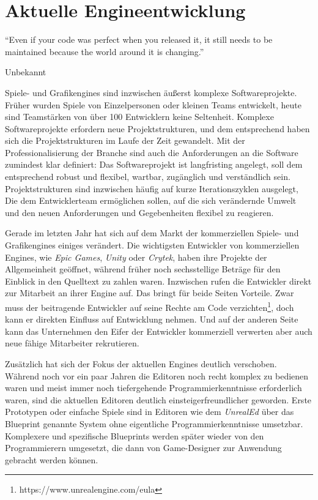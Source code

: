 \chapter{Aktuelle Engineentwicklung}
\label{chap:engine-uebersicht}

\epigraph{"`Even if your code was perfect when you released it, it still needs to be maintained because the world around it is changing."'}{Unbekannt}

Spiele- und Grafikengines sind inzwischen äußerst komplexe Softwareprojekte. Früher wurden Spiele von Einzelpersonen oder kleinen Teams entwickelt, heute sind Teamstärken von über 100 Entwicklern keine Seltenheit. Komplexe Softwareprojekte erfordern neue Projektstrukturen, und dem entsprechend haben sich die Projektstrukturen im Laufe der Zeit gewandelt. Mit der Professionalisierung der Branche sind auch die Anforderungen an die Software zumindest klar definiert: Das Softwareprojekt ist langfristing angelegt, soll dem entsprechend robust und flexibel, wartbar, zugänglich und verständlich sein. Projektstrukturen sind inzwischen häufig auf kurze Iterationszyklen ausgelegt, Die dem Entwicklerteam ermöglichen sollen, auf die sich verändernde Umwelt und den neuen Anforderungen und Gegebenheiten flexibel zu reagieren.

Gerade im letzten Jahr hat sich auf dem Markt der kommerziellen Spiele- und Grafikengines einiges verändert. Die wichtigsten Entwickler von kommerziellen Engines, wie \textit{Epic Games}, \textit{Unity} oder \textit{Crytek}, haben ihre Projekte der Allgemeinheit geöffnet, während früher noch sechsstellige Beträge für den Einblick in den Quelltext zu zahlen waren. Inzwischen rufen die Entwickler direkt zur Mitarbeit an ihrer Engine auf. Das bringt für beide Seiten Vorteile. Zwar muss der beitragende Entwickler auf seine Rechte am Code verzichten\footnote{https://www.unrealengine.com/eula}, doch kann er direkten Einfluss auf Entwicklung nehmen. Und auf der anderen Seite kann das Unternehmen den Eifer der Entwickler kommerziell verwerten aber auch neue fähige Mitarbeiter rekrutieren.

Zusätzlich hat sich der Fokus der aktuellen Engines deutlich verschoben. Während noch vor ein paar Jahren die Editoren noch recht komplex zu bedienen waren und meist immer noch tiefergehende Programmierkenntnisse erforderlich waren, sind die aktuellen Editoren deutlich einsteigerfreundlicher geworden. Erste Prototypen oder einfache Spiele sind in Editoren wie dem \textit{UnrealEd} über das Blueprint genannte System ohne eigentliche Programmierkenntnisse umsetzbar. Komplexere und spezifische Blueprints werden später wieder von den Programmierern umgesetzt, die dann von Game-Designer zur Anwendung gebracht werden können.

